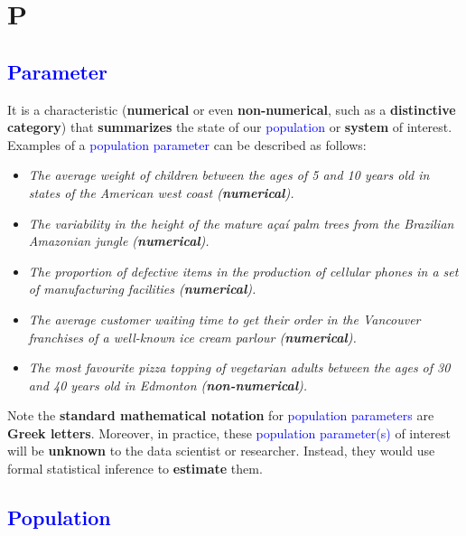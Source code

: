 \documentclass[
  letterpaper,
  DIV=11,
  numbers=noendperiod]{scrreprt}
\providecommand{\tightlist}{%
  \setlength{\itemsep}{0pt}\setlength{\parskip}{0pt}}\usepackage{longtable,booktabs,array}
\begin{document}
\section*{P}\label{p}


\subsection*{\texorpdfstring{\textcolor{blue}{Parameter}}{}}\label{section-5}

It is a characteristic (\textbf{numerical} or even
\textbf{non-numerical}, such as a \textbf{distinctive category}) that
\textbf{summarizes} the state of our \textcolor{blue}{population} or
\textbf{system} of interest. Examples of a
\textcolor{blue}{population parameter} can be described as follows:

\begin{itemize}
\tightlist
\item
  \emph{The average weight of children between the ages of 5 and 10
  years old in states of the American west coast (\textbf{numerical}).}
\item
  \emph{The variability in the height of the mature açaí palm trees from
  the Brazilian Amazonian jungle (\textbf{numerical}).}
\item
  \emph{The proportion of defective items in the production of cellular
  phones in a set of manufacturing facilities (\textbf{numerical}).}
\item
  \emph{The average customer waiting time to get their order in the
  Vancouver franchises of a well-known ice cream parlour
  (\textbf{numerical}).}
\item
  \emph{The most favourite pizza topping of vegetarian adults between
  the ages of 30 and 40 years old in Edmonton (\textbf{non-numerical}).}
\end{itemize}

Note the \textbf{standard mathematical notation} for
\textcolor{blue}{population parameters} are \textbf{Greek letters}.
Moreover, in practice, these \textcolor{blue}{population parameter(s)}
of interest will be \textbf{unknown} to the data scientist or
researcher. Instead, they would use formal statistical inference to
\textbf{estimate} them.

\subsection*{\texorpdfstring{\textcolor{blue}{Population}}{}}\label{section-6}
\end{document}
